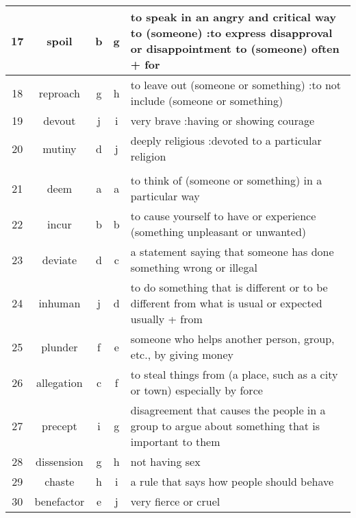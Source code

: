 \documentclass[a4paper]{article}
\begin{document}
\begin{center}
\begin{tabular}{|c|c|c|c|m{}|}
\hline
 17  & spoil & b & g &  to speak in an angry and critical way to (someone) :to express disapproval or disappointment to (someone) often + for \\
\hline
 18  & reproach & g & h &  to leave out (someone or something) :to not include (someone or something) \\
\hline
 19  & devout & j & i &  very brave :having or showing courage \\
\hline
 20  & mutiny & d & j &  deeply religious :devoted to a particular religion \\
\hline
 & & & & \\
\hline
 21  & deem & a & a &  to think of (someone or something) in a particular way \\
\hline
 22  & incur & b & b &  to cause yourself to have or experience (something unpleasant or unwanted) \\
\hline
 23  & deviate & d & c &  a statement saying that someone has done something wrong or illegal \\
\hline
 24  & inhuman & j & d &  to do something that is different or to be different from what is usual or expected usually + from \\
\hline
 25  & plunder & f & e &  someone who helps another person, group, etc., by giving money \\
\hline
 26  & allegation & c & f &  to steal things from (a place, such as a city or town) especially by force \\
\hline
 27  & precept & i & g &  disagreement that causes the people in a group to argue about something that is important to them \\
\hline
 28  & dissension & g & h &  not having sex \\
\hline
 29  & chaste & h & i &  a rule that says how people should behave \\
\hline
 30  & benefactor & e & j &  very fierce or cruel \\
\hline
\end{tabular}
\end{center}
\end{document}
